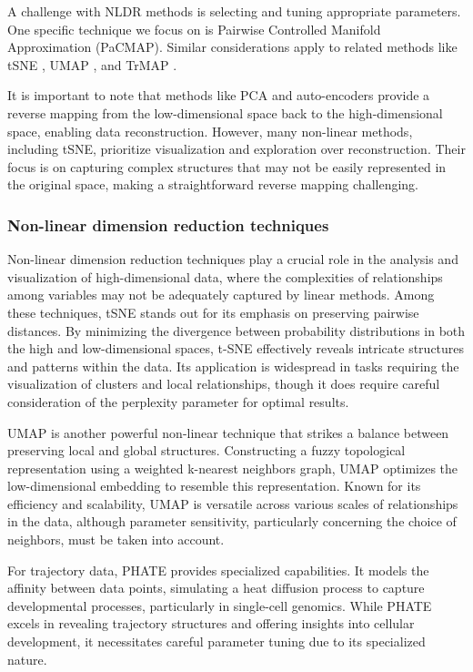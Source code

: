 \documentclass[
  12pt]{article}
\begin{document}
A challenge with NLDR methods is selecting and tuning appropriate
parameters. One specific technique we focus on is Pairwise Controlled
Manifold Approximation (PaCMAP). Similar considerations apply to related
methods like tSNE \citep{Laurens2008}, UMAP \citep{Leland2018}, and
TrMAP \citep{article02}.

It is important to note that methods like PCA and auto-encoders
\citep{article65} provide a reverse mapping from the low-dimensional
space back to the high-dimensional space, enabling data reconstruction.
However, many non-linear methods, including tSNE, prioritize
visualization and exploration over reconstruction. Their focus is on
capturing complex structures that may not be easily represented in the
original space, making a straightforward reverse mapping challenging.

\hypertarget{non-linear-dimension-reduction-techniques}{%
\subsubsection{Non-linear dimension reduction
techniques}\label{non-linear-dimension-reduction-techniques}}

Non-linear dimension reduction techniques play a crucial role in the
analysis and visualization of high-dimensional data, where the
complexities of relationships among variables may not be adequately
captured by linear methods. Among these techniques, tSNE stands out for
its emphasis on preserving pairwise distances. By minimizing the
divergence between probability distributions in both the high and
low-dimensional spaces, t-SNE effectively reveals intricate structures
and patterns within the data. Its application is widespread in tasks
requiring the visualization of clusters and local relationships, though
it does require careful consideration of the perplexity parameter for
optimal results.

UMAP is another powerful non-linear technique that strikes a balance
between preserving local and global structures. Constructing a fuzzy
topological representation using a weighted k-nearest neighbors graph,
UMAP optimizes the low-dimensional embedding to resemble this
representation. Known for its efficiency and scalability, UMAP is
versatile across various scales of relationships in the data, although
parameter sensitivity, particularly concerning the choice of neighbors,
must be taken into account.

For trajectory data, PHATE provides specialized capabilities. It models
the affinity between data points, simulating a heat diffusion process to
capture developmental processes, particularly in single-cell genomics.
While PHATE excels in revealing trajectory structures and offering
insights into cellular development, it necessitates careful parameter
tuning due to its specialized nature.
\end{document}
